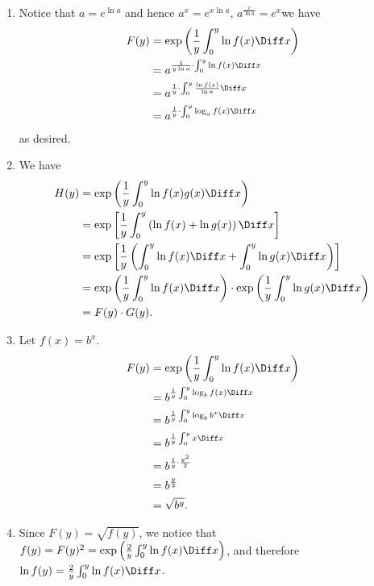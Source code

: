 \Question{\currfilebase}

\begin{enumerate}
    \item Notice that \(a = e^{\ln a}\) and hence \(a^x = e^{x \ln a}\), \(a^{\frac{x}{\ln a}} = e^x\)we have
    \begin{align*}
        F(y) &= \exp \left(\frac{1}{y} \int_0^y \ln f(x) \Diff x\right)\\
        &= a^{\frac{1}{y \ln a} \cdot \int_0^y \ln f(x) \Diff x}\\
        &= a^{\frac{1}{y} \cdot \int_0^y \frac{\ln f(x)}{\ln a} \Diff x}\\
        &= a^{\frac{1}{y} \cdot \int_0^y \log_a f(x) \Diff x}
    \end{align*}
    as desired.

    \item We have
    \begin{align*}
        H(y) &= \exp \left(\frac{1}{y} \int_0^y \ln f(x) g(x) \Diff x\right)\\
        &= \exp \left[\frac{1}{y} \int_0^y \left(\ln f(x) + \ln g(x)\right) \Diff x\right]\\
        &= \exp \left[\frac{1}{y} \left(\int_0^y \ln f(x) \Diff x + \int_0^y \ln g(x) \Diff x\right)\right]\\
        &= \exp \left(\frac{1}{y} \int_0^y \ln f(x) \Diff x\right) \cdot \exp \left(\frac{1}{y} \int_0^y \ln g(x) \Diff x\right)\\
        &= F(y) \cdot G(y).
    \end{align*}

    \item Let \(f(x) = b^x\).
    \begin{align*}
        F(y) &= \exp \left(\frac{1}{y} \int_0^y \ln f(x) \Diff x\right)\\
        &= b^{\frac{1}{y} \int_0^y \log_b f(x) \Diff x}\\
        &= b^{\frac{1}{y} \int_0^y \log_b b^x \Diff x}\\
        &= b^{\frac{1}{y} \int_0^y x \Diff x}\\
        &= b^{\frac{1}{y} \cdot \frac{y^2}{2}}\\
        &= b^{\frac{y}{2}}\\
        &= \sqrt{b^y}.
    \end{align*}

    \item Since \(F(y) = \sqrt{f(y)}\), we notice that \(f(y) = F(y)^2 = \exp \left(\frac{2}{y} \int_0^y \ln f(x) \Diff x\right)\), and therefore \(\ln f(y) = \frac{2}{y} \int_0^y \ln f(x) \Diff x\).
    

\end{enumerate}
